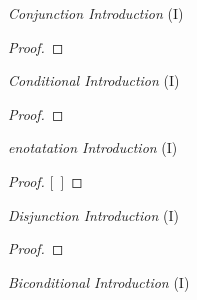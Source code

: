 \documentclass[a4paper, 11pt]{article} %
\begin{document}
\iffalse

\begin{multicols}{2}


\textit{Conjunction Introduction} (\eand I) \vspace{-1em}
\begin{proof}
	 
	 
\end{proof}

\vspace{1em}

\textit{Conditional Introduction} (\eif I) \vspace{-1em}
\begin{proof}
	\open
	\close
\end{proof}

\vspace{0.6em}

\textit{enotatation Introduction} (\enot I) \vspace{-1em}
\begin{proof}
\open
	\metaA{}    %
	\metaB{}
\close
{}[\ ]{\enot\metaA{}}
\end{proof}

\vspace{0.6em}

\textit{Disjunction Introduction} (\eor I) \vspace{-1em}

\begin{proof}
\end{proof}

\vspace{0.6em}

\textit{Biconditional Introduction} (\eiff I) \vspace{-1em}

\begin{fitchproof}
	\open
		 
	\close
\breakline
	\open
		 
	\close
\end{fitchproof}



\end{multicols}
\end{document}
